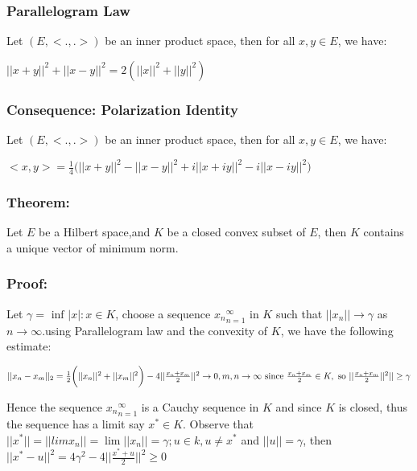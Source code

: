 \documentclass[12pt]{article}
\begin{document}
\subsubsection*{Parallelogram Law}
Let $(E,<.,.>)$ be an inner product space, then for all $x,y \in E$, we have:

\begin{math}
    ||x+y||^2 + ||x-y||^2 = 2(||x||^2 + ||y||^2)
\end{math}

\subsubsection*{Consequence: Polarization Identity}
Let $(E,<.,.>)$ be an inner product space, then for all $x,y \in E$, we have:

\begin{math}\label{eq:*}
    <x,y> = \frac{1}{4} \biggl(||x+y||^2 - ||x-y||^2 + i||x+iy||^2 - i||x-iy||^2 \biggr)
\end{math}


\subsubsection*{Theorem:}
Let $E$ be a Hilbert space,and $K$ be a closed convex subset of $E$, then $K$ contains a unique vector of minimum norm.

\subsubsection*{Proof:}
Let $\gamma = \text{ inf }{|x|: x \in K}$, choose a sequence ${x_n}^{\infty}_{n=1}$ in $K$ such that $||x_n|| \to \gamma$ as $n \to \infty$.using Parallelogram law and the convexity of $K$, we have the following estimate:

\begin{math}
    ||x_n - x_m||_{2} = \frac{1}{2} \biggl(||x_n||^2 + ||x_m||^2 \biggr) - 4||\frac{x_n + x_m}{2}||^{2} \to 0, m,n  \to \infty \\
    \text{ since } \frac{x_n + x_m}{2} \in K, \text{ so } ||\frac{x_n + x_m}{2}||^{2}|| \geq \gamma
\end{math}

Hence the sequence ${x_n}^{\infty}_{n=1}$ is a Cauchy sequence in $K$ and since $K$ is closed, thus the sequence has a limit say $x^* \in K$.
Observe that $|| x^* || = ||lim x_n|| = \lim ||x_n|| = \gamma; u \in k, u \ne x^*$ and $||u|| = \gamma$, then $||x^* - u||^2 = 4\gamma^2 - 4||\frac{x^* + u}{2}||^2 \ge 0$
\end{document}
